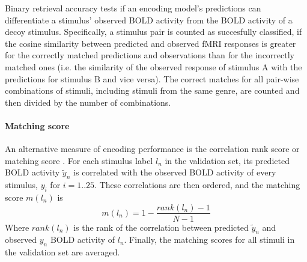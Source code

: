 Binary retrieval accuracy \citep{ML08} tests if an encoding model's predictions
can differentiate a stimulus' observed BOLD activity from the BOLD activity of
a decoy stimulus.  Specifically, a stimulus pair is counted as succesfully
classified, if the cosine similarity between predicted and observed f{MRI}
responses is greater for the correctly matched predictions and observations
than for the incorrectly matched ones (i.e. the similarity of the observed
response of stimulus A with the predictions for stimulus B and vice versa).
The correct matches for all pair-wise combinations of stimuli, including
stimuli from the same genre, are counted and then divided by the number of
combinations.

\paragraph{Matching score}
%
An alternative measure of encoding performance is the correlation rank score or
matching score \citep{SF14}. For each stimulus label $l_{n}$ in the validation
set, its predicted BOLD activity $\widetilde{y}_{n}$ is correlated with the
observed BOLD activity of every stimulus, $y_{i}$ for $i=1..25$. These
correlations are then ordered, and the  matching score $m(l_{n})$ is \[
m(l_{n}) = 1-\frac{rank(l_{n})-1}{N-1} \] Where $rank(l_{n})$ is the rank of
the correlation between predicted $\widetilde{y}_{n}$ and observed $y_{n}$ BOLD
activity of $l_{n}$. Finally, the matching scores for all stimuli in the
validation set are averaged.



